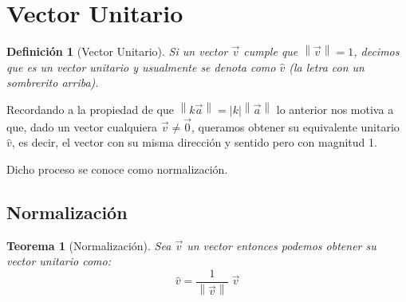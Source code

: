 \documentclass[12pt, fleqn]{report}                             %
\newtheorem{Theorem}        {Teorema}[section]                  %
\newtheorem{Definition}     {Definición}[section]               %
\theoremstyle{break}                                            %
\newcommand{\abs}[1]    {\left\lvert #1 \right\lvert}           %
\newcommand{\Abs}[1]    {\left\lVert #1 \right\lVert}           %
\begin{document}
        \clearpage
        \section{Vector Unitario}

            \begin{Definition}[Vector Unitario]
                Si un vector $\vec{v}$ cumple que $\Abs{\vec{v}} = 1$, decimos que es un
                \emph{vector unitario} y usualmente se denota como $\hat{v}$ (la letra con un sombrerito arriba).
            \end{Definition}

            Recordando a la propiedad de que $\Abs{k\vec{a}} = \abs{k} \Abs{\vec{a}}$ lo anterior
            nos motiva a que, dado un vector cualquiera $\vec{v} \neq \vec{0}$, queramos obtener
            su equivalente unitario $\hat{v}$, es decir, el vector con su misma dirección y sentido
            pero con magnitud 1.

            Dicho proceso se conoce como normalización.

            \subsection{Normalización}
                
                \begin{Theorem}[Normalización]
                    Sea $\vec{v}$ un vector entonces podemos obtener su vector unitario como:
                    \begin{equation}
                        \hat{v} = \dfrac{1}{ \Abs{\vec{v}}} \; \vec{v}
                    \end{equation}
                \end{Theorem}
            
\end{document}
